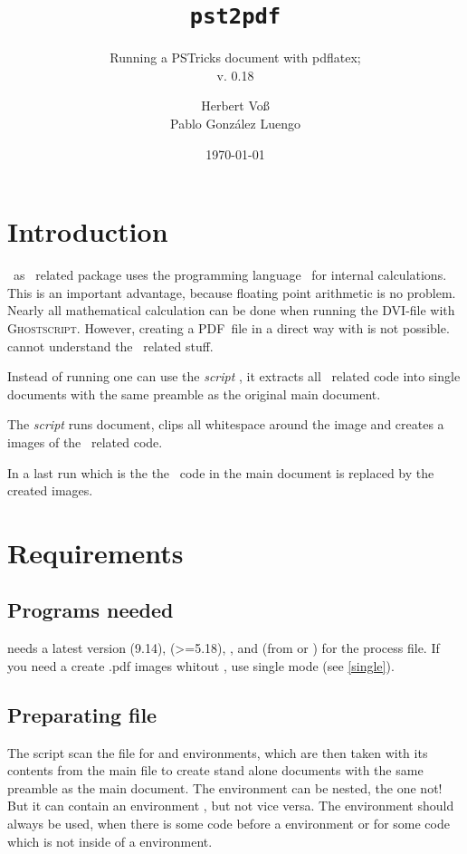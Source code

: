 \documentclass[11pt,english,BCOR=10mm,DIV=12,bibliography=totoc,parskip=false,headings=small,
    headinclude=false,footinclude=false,twoside]{pst-doc}
\def\DVI{\textsc{DVI}}
\def\PDF{\textsc{PDF}}
\def\gs{\textsc{Ghostscript}}
\begin{document}
\title{\texttt{pst2pdf}}
\subtitle{Running a PSTricks document with pdflatex;\\  \small v. 0.18}
\author{Herbert Voß  \\ Pablo Gonz\'{a}lez Luengo}
\docauthor{}
\date{\today}
\maketitle

\tableofcontents

\clearpage

\section{Introduction}
\PST\ as \PS\ related package uses the programming language \PS\ for internal
calculations. This is an important advantage, because floating point arithmetic is no
problem. Nearly all mathematical calculation can be done when running the \DVI-file
with \gs. However, creating a \PDF\ file in a direct way with  is
not possible.  cannot understand the \PS\ related stuff. 

Instead of running  one can use the  \emph{script} , it extracts
all \PST\ related code into single documents with the same preamble as the original
main document.

The  \emph{script} runs document, clips all whitespace around the
image and creates a  images of the \PST\ related code. 

In a last run which is the  the \PST\ code in the
main document is replaced by the created images.

\section{Requirements}
\subsection{Programs needed}
 needs a latest version  (9.14),  (>=5.18), ,  and 
(from  or ) for the process file. If you need a create .pdf images whitout , use single mode (see \ref{single}).

\subsection{Preparating file}
The script scan the file for  and  environments,
which are then taken with its contents from the main file to create stand alone documents
with the same preamble as the main document. The  environment can be nested,
the  one not! But it can contain an environment , but not vice versa.
The  environment should always be used, when there is some code before a 
environment or for some code which is not inside of a  environment.
\end{document}

